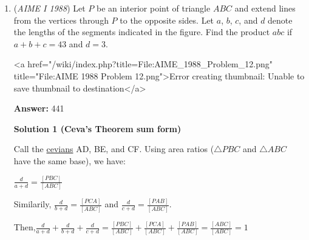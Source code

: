 \begin{enumerate}
 $\sum_{k=1}^5 z_k = 3 + 504i$

 We write the numbers in the form $a + bi$ and we know that 

 $\sum_{k=1}^5 a_k = 3$ and $\sum_{k=1}^5 b_k = 504$

 The line is of equation $y=mx+3$. Substituting in the coordinates, we have $b_k = ma_k + 3$.

 Summing all 5 of the equations given for each $k$, we get 

 $504 =  3m + 15$

 Solving for $m$, the slope, we get $\boxed{163}$




\textbf{Solution 3}

The mean line for $w_1, . . ., w_5$ must pass through the mean (the center of mass) of these points, which, if we graph them on the complex plane, is $(\frac{3}{5}, \frac{504i}{5})$. Since we now have two points, namely that one and $(0, 3i)$, we can simply find the slope between them, which is $\boxed{163}$ by the good ol' slope formula.

 


	\item (\textit{AIME I 1988}) Let $P$ be an interior point of triangle $ABC$ and extend lines from the vertices through $P$ to the opposite sides. Let $a$, $b$, $c$, and $d$ denote the lengths of the segments indicated in the figure. Find the product $abc$ if $a + b + c = 43$ and $d = 3$. 


 <a href="/wiki/index.php?title=File:AIME\_1988\_Problem\_12.png" title="File:AIME 1988 Problem 12.png">Error creating thumbnail: Unable to save thumbnail to destination</a>

 \textbf{Answer: }441



\textbf{Solution 1 (Ceva's Theorem sum form)}

Call the \href{https://artofproblemsolving.com/wiki/index.php?title=Cevian}{cevians} AD, BE, and CF. Using area ratios ($\triangle PBC$ and $\triangle ABC$ have the same base), we have: 

 $\frac {d}{a + d} = \frac {[PBC]}{[ABC]}$

 Similarily, $\frac {d}{b + d} = \frac {[PCA]}{[ABC]}$ and $\frac {d}{c + d} = \frac {[PAB]}{[ABC]}$.

 Then,$\frac {d}{a + d} + \frac {d}{b + d} + \frac {d}{c + d} = \frac {[PBC]}{[ABC]} + \frac {[PCA]}{[ABC]} + \frac {[PAB]}{[ABC]} = \frac {[ABC]}{[ABC]} = 1$


\end{enumerate}
